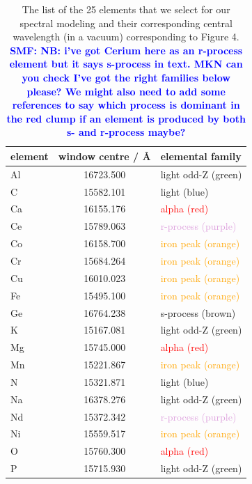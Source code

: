 \documentclass[a4paper,fleqn,usenatbib]{mnras}
\newcommand{\smf}[1]{\textbf{\textcolor{blue}{SMF: #1}}}
\begin{document}
\begin{table}
    \centering
    \caption{The list of the 25 elements that we select for our spectral modeling and their corresponding central wavelength (in a vacuum) corresponding to Figure 4. \smf{NB: i've got Cerium here as an r-process element but it says s-process in text. MKN can you check I've got the right families below please? We might also need to add some references to say which process is dominant in the red clump if an element is produced by both s- and r-process maybe?}}
    \label{tab:window_centres}
    \begin{tabular}{lcl}
        \hline
        element & window centre / \AA & elemental family \\
        \hline
        Al & 16723.500 & \textcolor{OliveGreen}{light odd-Z (green)} \\
        C & 15582.101 & \textcolor{NavyBlue}{light (blue)} \\
        Ca & 16155.176 & \textcolor{red}{alpha (red)} \\
        Ce & 15789.063 & \textcolor{Plum}{r-process (purple)} \\
        Co & 16158.700 & \textcolor{orange}{iron peak (orange)} \\
        Cr & 15684.264 & \textcolor{orange}{iron peak (orange)} \\
        Cu & 16010.023 & \textcolor{orange}{iron peak (orange)} \\
        Fe & 15495.100 & \textcolor{orange}{iron peak (orange)} \\
        Ge & 16764.238 & \textcolor{Sepia}{s-process (brown)} \\
        K & 15167.081 & \textcolor{OliveGreen}{light odd-Z (green)} \\
        Mg & 15745.000 & \textcolor{red}{alpha (red)} \\
        Mn & 15221.867 & \textcolor{orange}{iron peak (orange)} \\
        N & 15321.871 & \textcolor{NavyBlue}{light (blue)} \\
        Na & 16378.276 & \textcolor{OliveGreen}{light odd-Z (green)} \\
        Nd & 15372.342 & \textcolor{Plum}{r-process (purple)} \\
        Ni & 15559.517 & \textcolor{orange}{iron peak (orange)} \\
        O & 15760.300 & \textcolor{red}{alpha (red)} \\
        P & 15715.930 & \textcolor{OliveGreen}{light odd-Z (green)} \\

\end{tabular}
\end{table}
\end{document}
